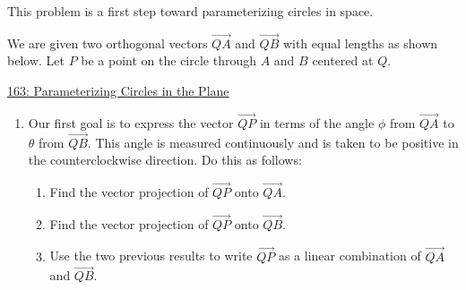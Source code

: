 \documentclass{ximera}
\begin{document}
\begin{question}  \label{Qdfds45rt54rr3tg}
This problem is a first step toward parameterizing circles in space. 

We are given two orthogonal vectors $\overrightarrow{QA}$ and $\overrightarrow{QB}$ with equal lengths as shown below. Let $P$ be a point on the circle through $A$ and $B$ centered at $Q$. 

\begin{onlineOnly}
    \begin{center}
\end{center}
\end{onlineOnly}

\href{https://www.desmos.com/calculator/arrfrcusn5}{163: Parameterizing Circles in the Plane}

\begin{enumerate}
\item{Our first goal is to express the vector $\overrightarrow{QP}$ in terms of the angle $\phi$ from $\overrightarrow{QA}$ to  $\theta$ from $\overrightarrow{QB}$. This angle is measured continuously and is taken to be positive in the counterclockwise direction. Do this as follows:}

\begin{enumerate}
\item{Find the vector projection of $\overrightarrow{QP}$ onto $\overrightarrow{QA}$.
\begin{multipleChoice}
\end{multipleChoice}
}
 \item{Find the vector projection of $\overrightarrow{QP}$ onto $\overrightarrow{QB}$.
\begin{multipleChoice}
\end{multipleChoice}
}

\item{Use the two previous results to write $\overrightarrow{QP}$ as a linear combination of  $\overrightarrow{QA}$ and $\overrightarrow{QB}$.
\begin{multipleChoice}
\end{multipleChoice}
}


\end{enumerate}
\end{enumerate}
\end{question}
\end{document}
